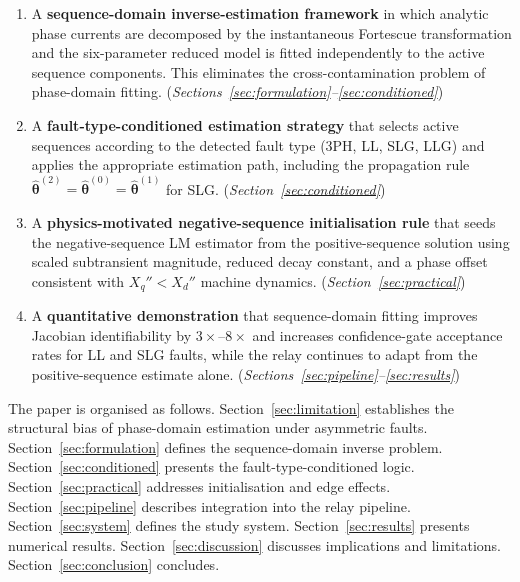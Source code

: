\documentclass[10pt,journal,twoside]{IEEEtran}
\begin{document}
\begin{enumerate}
\item A \textbf{sequence-domain inverse-estimation framework} in which
      analytic phase currents are decomposed by the instantaneous Fortescue
      transformation and the six-parameter reduced model is fitted independently
      to the active sequence components.  This eliminates the cross-contamination
      problem of phase-domain fitting.
      (\textit{Sections~\ref{sec:formulation}--\ref{sec:conditioned}})

\item A \textbf{fault-type-conditioned estimation strategy} that selects
      active sequences according to the detected fault type (3PH, LL, SLG, LLG)
      and applies the appropriate estimation path, including
      the propagation rule $\hat{\bm{\theta}}^{(2)} = \hat{\bm{\theta}}^{(0)}
      = \hat{\bm{\theta}}^{(1)}$ for SLG.
      (\textit{Section~\ref{sec:conditioned}})

\item A \textbf{physics-motivated negative-sequence initialisation rule}
      that seeds the negative-sequence LM estimator from the positive-sequence
      solution using scaled subtransient magnitude, reduced decay constant, and
      a phase offset consistent with $X_q'' < X_d''$ machine dynamics.
      (\textit{Section~\ref{sec:practical}})

\item A \textbf{quantitative demonstration} that sequence-domain fitting
      improves Jacobian identifiability by $3\times$--$8\times$ and increases
      confidence-gate acceptance rates for LL and SLG faults, while the
      relay continues to adapt from the positive-sequence estimate alone.
      (\textit{Sections~\ref{sec:pipeline}--\ref{sec:results}})
\end{enumerate}

\noindent
The paper is organised as follows.
Section~\ref{sec:limitation} establishes the structural bias of phase-domain
estimation under asymmetric faults.
Section~\ref{sec:formulation} defines the sequence-domain inverse problem.
Section~\ref{sec:conditioned} presents the fault-type-conditioned logic.
Section~\ref{sec:practical} addresses initialisation and edge effects.
Section~\ref{sec:pipeline} describes integration into the relay pipeline.
Section~\ref{sec:system} defines the study system.
Section~\ref{sec:results} presents numerical results.
Section~\ref{sec:discussion} discusses implications and limitations.
Section~\ref{sec:conclusion} concludes.
\end{document}
